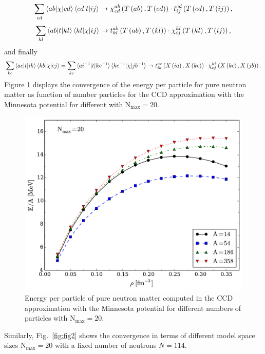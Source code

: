 \[
\sum_{cd} \braket{ab| \chi |cd} \braket{cd| t
    |ij} \rightarrow \chi_{cd}^{ab}\left( T\left( ab\right),T\left(
  cd\right)\right)\cdot t_{ij}^{cd}\left( T\left( cd\right),T\left(
  ij\right)\right),
\] 
\[
\sum_{kl} \braket{ab| t |kl} \braket{kl| \chi |ij} \rightarrow t_{kl}^{ab}\left( T\left( ab\right),T\left(
  kl\right)\right)\cdot \chi_{ij}^{kl}\left( T\left( kl\right),T\left(ij\right)\right),
\]
and finally
\[
\sum_{kc} \braket{ac| t |ik}\braket{kb| \chi
    |cj} = \sum_{kc} \braket{ai^{-1}| t |kc^{-1}}\braket{kc^{-1}| \chi
    |jb^{-1}} \rightarrow t_{ik}^{ac}\left( X\left( ia\right),X\left(
  kc\right)\right)\cdot \chi_{cj}^{kb}\left( X\left( kc\right),X\left(
  jb\right)\right).
\]
Figure \ref{fig:fig1} displays the convergence of the energy per particle for pure neutron matter as function of number particles 
for  the CCD approximation with the Minnesota potential for different with $\mathrm{N_{max}=20}$.
  \begin{figure}
    \includegraphics[width=\linewidth]{Chapter8-figures/fig1.pdf}
    \caption{Energy per particle of pure neutron matter computed in
      the CCD approximation with the Minnesota potential for different
      numbers of particles with $\mathrm{N_{max}=20}$.}
    \label{fig:fig1}
  \end{figure}
Similarly, Fig.~\ref{fig:fig2} shows the convergence in terms of different model space sizes $\mathrm{N_{max}=20}$ with 
a fixed number of neutrons $N=114$. 
